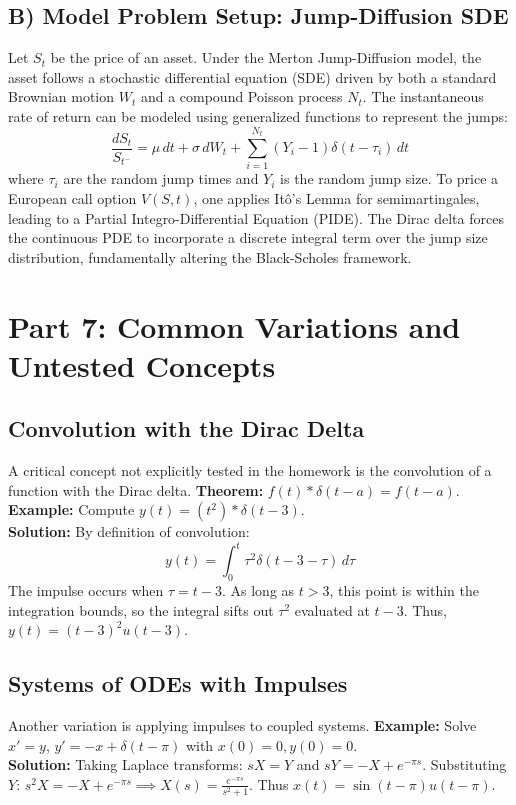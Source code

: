 \documentclass[11pt, letterpaper]{article}
\theoremstyle{definition}
\theoremstyle{remark}
\begin{document}
\subsection{B) Model Problem Setup: Jump-Diffusion SDE}
Let $S_t$ be the price of an asset. Under the Merton Jump-Diffusion model, the asset follows a stochastic differential equation (SDE) driven by both a standard Brownian motion $W_t$ and a compound Poisson process $N_t$. The instantaneous rate of return can be modeled using generalized functions to represent the jumps:
\[ \frac{dS_t}{S_{t^-}} = \mu \, dt + \sigma \, dW_t + \sum_{i=1}^{N_t} (Y_i - 1)\delta(t - \tau_i) \, dt \]
where $\tau_i$ are the random jump times and $Y_i$ is the random jump size. To price a European call option $V(S,t)$, one applies Itô's Lemma for semimartingales, leading to a Partial Integro-Differential Equation (PIDE). The Dirac delta forces the continuous PDE to incorporate a discrete integral term over the jump size distribution, fundamentally altering the Black-Scholes framework.

\newpage
\section{Part 7: Common Variations and Untested Concepts}

\subsection{Convolution with the Dirac Delta}
A critical concept not explicitly tested in the homework is the convolution of a function with the Dirac delta. 
\textbf{Theorem:} $f(t) * \delta(t-a) = f(t-a)$.
\\[4pt]
\textbf{Example:} Compute $y(t) = (t^2) * \delta(t-3)$.
\\[4pt]
\textbf{Solution:} By definition of convolution:
\[ y(t) = \int_{0}^{t} \tau^2 \delta(t - 3 - \tau) \, d\tau \]
The impulse occurs when $\tau = t - 3$. As long as $t > 3$, this point is within the integration bounds, so the integral sifts out $\tau^2$ evaluated at $t-3$. Thus, $y(t) = (t-3)^2 u(t-3)$.

\subsection{Systems of ODEs with Impulses}
Another variation is applying impulses to coupled systems.
\textbf{Example:} Solve $x' = y$, $y' = -x + \delta(t-\pi)$ with $x(0)=0, y(0)=0$.
\\[4pt]
\textbf{Solution:} Taking Laplace transforms: $sX = Y$ and $sY = -X + e^{-\pi s}$. Substituting $Y$: $s^2 X = -X + e^{-\pi s} \implies X(s) = \frac{e^{-\pi s}}{s^2+1}$. Thus $x(t) = \sin(t-\pi)u(t-\pi)$.
\end{document}
